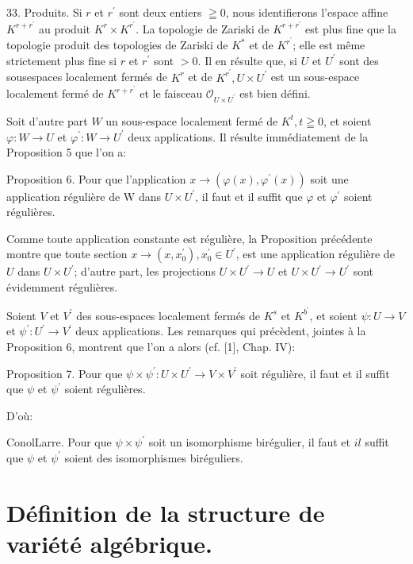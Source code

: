 33. Produits. Si $r$ et $r^{\prime}$ sont deux entiers $\geqq 0$, nous identifierons l'espace affine $K^{r+r^{\prime}}$ au produit $K^{r} \times K^{r^{\prime}}$. La topologie de Zariski de $K^{r+r^{\prime}}$ est plus fine que la topologie produit des topologies de Zariski de $K^{*}$ et de $K^{r^{\prime}}$; elle est même strictement plus fine si $r$ et $r^{\prime}$ sont $>0 .$ Il en résulte que, si $U$ et $U^{\prime}$ sont des sousespaces localement fermés de $K^{r}$ et de $K^{r^{\prime}}, U \times U^{\prime}$ est un sous-espace localement fermé de $K^{r+r^{\prime}}$ et le faisceau $\mathcal{O}_{U \times U^{\prime}}$ est bien défini.

Soit d'autre part $W$ un sous-espace localement fermé de $K^{t}, t \geqq 0$, et soient $\varphi: W \rightarrow U$ et $\varphi^{\prime}: W \rightarrow U^{\prime}$ deux applications. Il résulte immédiatement de la Proposition 5 que l'on a:

Proposition $6 .$ Pour que l'application $x \rightarrow\left(\varphi(x), \varphi^{\prime}(x)\right)$ soit une application régulière de W dans $U \times U^{\prime}$, il faut et il suffit que $\varphi$ et $\varphi^{\prime}$ soient régulières.

Comme toute application constante est régulière, la Proposition précédente montre que toute section $x \rightarrow\left(x, x_{0}^{\prime}\right), x_{0}^{\prime} \in U^{\prime}$, est une application régulière de $U$ dans $U \times U^{\prime}$; d'autre part, les projections $U \times U^{\prime} \rightarrow U$ et $U \times U^{\prime} \rightarrow U^{\prime}$ sont évidemment régulières.

Soient $V$ et $V^{\prime}$ des sous-espaces localement fermés de $K^{s}$ et $K^{b^{\prime}}$, et soient $\psi: U \rightarrow V$ et $\psi^{\prime}: U^{\prime} \rightarrow V^{\prime}$ deux applications. Les remarques qui précèdent, jointes à la Proposition 6, montrent que l'on a alors (cf. [1], Chap. IV):

Proposition 7. Pour que $\psi \times \psi^{\prime}: U \times U^{\prime} \rightarrow V \times V^{\prime}$ soit régulière, il faut et il suffit que $\psi$ et $\psi^{\prime}$ soient régulières.

D'où:

ConolLarre. Pour que $\psi \times \psi^{\prime}$ soit un isomorphisme birégulier, il faut et $i l$ suffit que $\psi$ et $\psi^{\prime}$ soient des isomorphismes biréguliers.

\section{Définition de la structure de variété algébrique.}

